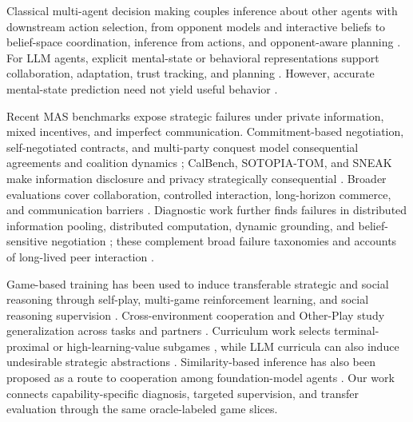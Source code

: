Classical multi-agent decision making couples inference about other agents with
downstream action selection, from opponent models and interactive beliefs
\citep{carmel1996opponent,gmytrasiewicz2005ipomdp,albrecht2013hba} to
belief-space coordination, inference from actions, and opponent-aware planning
\citep{macindoe2012pomcop,wu2021toomanycooks,foerster2019bad,huang2024hop}.
For LLM agents, explicit mental-state or behavioral representations support
collaboration, adaptation, trust tracking, and planning
\citep{li2023theory,cross2025hypothetical,jha2026modeling,mu2026adaptive,
zhou2026epistemic,feng2026sigmamem,goel2026bayesian,hwang2026infusing}.
However, accurate mental-state prediction need not yield useful behavior
\citep{riemer2025tom,sobotka2026strategic}.

Recent MAS benchmarks expose strategic failures under private information,
mixed incentives, and imperfect communication. Commitment-based negotiation,
self-negotiated contracts, and multi-party conquest model consequential
agreements and coalition dynamics \citep{benac2026benchmark,wyse2026commitment,
oneill2026cooperate}; CalBench, SOTOPIA-TOM, and SNEAK make information
disclosure and privacy strategically consequential \citep{zou2026calbench,
ys2026sotopiatom,avsian2026sneak}. Broader evaluations cover collaboration,
controlled interaction, long-horizon commerce, and communication barriers
\citep{zhu2025multiagentbench,chen2026collabsim,li2026emergent,
xuan2026socialveil}. Diagnostic work further finds failures in distributed
information pooling, distributed computation, dynamic grounding, and
belief-sensitive negotiation \citep{li2026systematic,zhang2026silobench,
yao2026talk,zhang2026termsbench,agashe2025llmcoordination}; these complement
broad failure taxonomies and accounts of long-lived peer interaction
\citep{cemri2025multiagent,anthropic2026multiagent}.

Game-based training has been used to induce transferable strategic and social
reasoning through self-play, multi-game reinforcement learning, and social
reasoning supervision \citep{yuan2026marshal,liu2026spiral,lyu2026gift,
he2026stratreasoner,hua2026socialrl,he2026socialgym,wu2026socialr1}.
Cross-environment cooperation and Other-Play study generalization across tasks
and partners \citep{jha2025crossenvironment,hu2020otherplay}. Curriculum work
selects terminal-proximal or high-learning-value subgames
\citep{west2020improved,chen2024subgame}, while LLM curricula can also induce
undesirable strategic abstractions \citep{madmoun2026communication}.
Similarity-based inference has also been proposed as a route to cooperation
among foundation-model agents \citep{meulemans2026gametheory}.
Our work connects capability-specific diagnosis, targeted supervision, and
transfer evaluation through the same oracle-labeled game slices.
